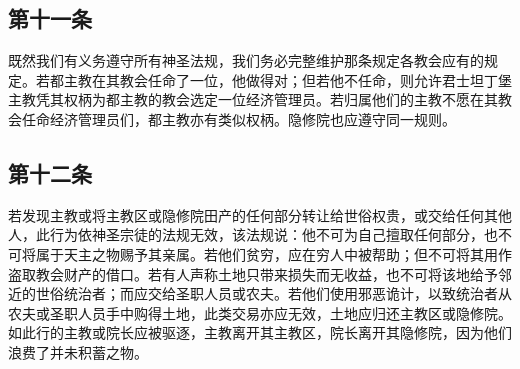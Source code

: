 \subsection{第十一条}

\par

既然我们有义务遵守所有神圣法规，我们务必完整维护那条规定各教会应有的规定。若都主教在其教会任命了一位，他做得对；但若他不任命，则允许君士坦丁堡主教凭其权柄为都主教的教会选定一位经济管理员。若归属他们的主教不愿在其教会任命经济管理员们，都主教亦有类似权柄。隐修院也应遵守同一规则。\par

\par


\subsection{第十二条}

\par

若发现主教或将主教区或隐修院田产的任何部分转让给世俗权贵，或交给任何其他人，此行为依神圣宗徒的法规无效，该法规说：他不可为自己擅取任何部分，也不可将属于天主之物赐予其亲属。若他们贫穷，应在穷人中被帮助；但不可将其用作盗取教会财产的借口。若有人声称土地只带来损失而无收益，也不可将该地给予邻近的世俗统治者；而应交给圣职人员或农夫。若他们使用邪恶诡计，以致统治者从农夫或圣职人员手中购得土地，此类交易亦应无效，土地应归还主教区或隐修院。如此行的主教或院长应被驱逐，主教离开其主教区，院长离开其隐修院，因为他们浪费了并未积蓄之物。\par

\par


